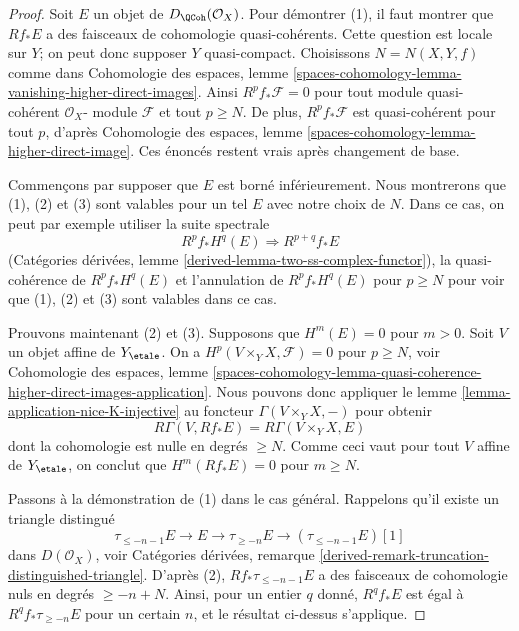 \begin{proof}
Soit $E$ un objet de $D_\QCoh(\mathcal{O}_X)$.
Pour démontrer (1), il faut montrer que $Rf_*E$ a des
faisceaux de cohomologie quasi-cohérents. Cette question est locale sur $Y$; on peut donc
supposer $Y$ quasi-compact. Choisissons $N = N(X, Y, f)$ comme dans
Cohomologie des espaces, lemme
\ref{spaces-cohomology-lemma-vanishing-higher-direct-images}.
Ainsi $R^pf_*\mathcal{F} = 0$ pour tout module quasi-cohérent $\mathcal{O}_X$-
module $\mathcal{F}$ et tout $p \geq N$. De plus, $R^pf_*\mathcal{F}$
est quasi-cohérent pour tout $p$, d'après
Cohomologie des espaces, lemme \ref{spaces-cohomology-lemma-higher-direct-image}.
Ces énoncés restent vrais après changement de base.

\medskip\noindent
Commençons par supposer que $E$ est borné inférieurement. Nous montrerons que (1), (2) et (3) sont valables
pour un tel $E$ avec notre choix de $N$. Dans ce cas, on peut par exemple utiliser la
suite spectrale
$$
R^pf_*H^q(E) \Rightarrow R^{p + q}f_*E
$$
(Catégories dérivées, lemme \ref{derived-lemma-two-ss-complex-functor}),
la quasi-cohérence de $R^pf_*H^q(E)$ et l'annulation de $R^pf_*H^q(E)$
pour $p \geq N$ pour voir que (1), (2) et (3) sont valables dans ce cas.

\medskip\noindent
Prouvons maintenant (2) et (3). Supposons que $H^m(E) = 0$ pour $m > 0$.
Soit $V$ un objet affine de $Y_\etale$.
On a $H^p(V \times_Y X, \mathcal{F}) = 0$ pour $p \geq N$, voir
Cohomologie des espaces, lemme
\ref{spaces-cohomology-lemma-quasi-coherence-higher-direct-images-application}.
Nous pouvons donc appliquer le lemme \ref{lemma-application-nice-K-injective}
au foncteur $\Gamma(V \times_Y X, -)$ pour obtenir
$$
R\Gamma(V, Rf_*E) = R\Gamma(V \times_Y X, E)
$$
dont la cohomologie est nulle en degrés $\geq N$. Comme ceci vaut pour
tout $V$ affine de $Y_\etale$, on conclut que $H^m(Rf_*E) = 0$
pour $m \geq N$.

\medskip\noindent
Passons à la démonstration de (1) dans le cas général. Rappelons qu'il existe un
triangle distingué
$$
\tau_{\leq -n - 1}E \to E \to \tau_{\geq -n}E \to
(\tau_{\leq -n - 1}E)[1]
$$
dans $D(\mathcal{O}_X)$, voir Catégories dérivées, remarque
\ref{derived-remark-truncation-distinguished-triangle}.
D'après (2), $Rf_*\tau_{\leq -n - 1}E$
a des faisceaux de cohomologie nuls en degrés $\geq -n + N$.
Ainsi, pour un entier $q$ donné, $R^qf_*E$ est égal
à $R^qf_*\tau_{\geq -n}E$ pour un certain $n$, et le résultat
ci-dessus s'applique.
\end{proof}


